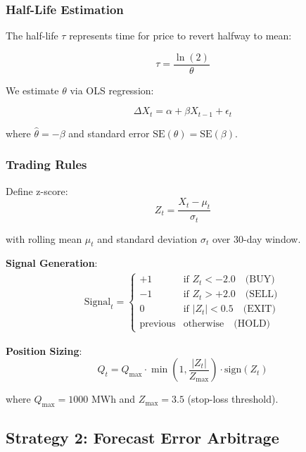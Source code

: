 \documentclass[12pt,a4paper]{article}
\begin{document}
\subsubsection{Half-Life Estimation}

The half-life $\tau$ represents time for price to revert halfway to mean:

\begin{equation}
\tau = \frac{\ln(2)}{\theta}
\end{equation}

We estimate $\theta$ via OLS regression:

\begin{equation}
\Delta X_t = \alpha + \beta X_{t-1} + \epsilon_t
\end{equation}

where $\hat{\theta} = -\beta$ and standard error $\text{SE}(\theta) = \text{SE}(\beta)$.

\subsubsection{Trading Rules}

Define z-score:
\begin{equation}
Z_t = \frac{X_t - \mu_t}{\sigma_t}
\end{equation}

with rolling mean $\mu_t$ and standard deviation $\sigma_t$ over 30-day window.

\textbf{Signal Generation}:
\begin{align}
\text{Signal}_t = \begin{cases}
+1 & \text{if } Z_t < -2.0 \quad \text{(BUY)} \\
-1 & \text{if } Z_t > +2.0 \quad \text{(SELL)} \\
0 & \text{if } |Z_t| < 0.5 \quad \text{(EXIT)} \\
\text{previous} & \text{otherwise} \quad \text{(HOLD)}
\end{cases}
\end{align}

\textbf{Position Sizing}:
\begin{equation}
Q_t = Q_{\max} \cdot \min\left(1, \frac{|Z_t|}{Z_{\max}}\right) \cdot \text{sign}(Z_t)
\end{equation}

where $Q_{\max} = 1000$ MWh and $Z_{\max} = 3.5$ (stop-loss threshold).

\subsection{Strategy 2: Forecast Error Arbitrage}
\end{document}
